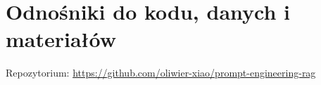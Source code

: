 \section{Odnośniki do kodu, danych i materiałów}
Repozytorium: \url{https://github.com/oliwier-xiao/prompt-engineering-rag}
